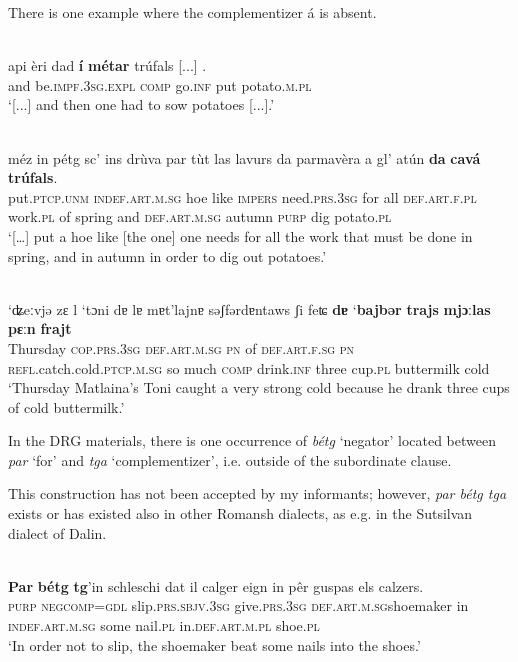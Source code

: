 There is one example where the complementizer á is absent.

\ea
\label{}
\\
	\gll [...] api èri dad \textbf{í} \textbf{métar} trúfals [...] .\\
{} and be.\textsc{impf.3sg.expl} \textsc{comp} go.\textsc{inf} put potato.\textsc{m.pl}\\
\glt `[...] and then one had to sow potatoes [...].'
\z


 \ea\label{}
 {\citealt[143]{Büchli1966}}\\
\gll  [...] méz in pétg sc’ ins drùva par tùt las lavurs da parmavèra a gl’ atún \textbf{da} \textbf{cavá} \textbf{trúfals}.\\
{} put.\textsc{ptcp.unm} \textsc{indef.art.m.sg} hoe like \textsc{impers} need.\textsc{prs.3sg} for all \textsc{def.art.f.pl} work.\textsc{pl} of spring and \textsc{def.art.m.sg} autumn \textsc{purp} dig potato.\textsc{pl}\\
\glt `[…] put a hoe like [the one] one needs for all the work that must be done in spring, and in autumn in order to dig out potatoes.'
\z

\ea\label{}
\\
\gll ‘ʥeːvjǝ zɛ l ‘tɔni dɐ lɐ mɐt’lajnɐ sǝʃfǝrdɐntaws ʃi feʨ \textbf{dɐ} ‘\textbf{bajbǝr} \textbf{trajs} \textbf{mjɔːlas} \textbf{pɛːn} \textbf{frajt}\\
     Thursday \textsc{cop.prs.3sg} \textsc{def.art.m.sg} \textsc{pn} of \textsc{def.art.f.sg} \textsc{pn} \textsc{refl}.catch.cold.\textsc{ptcp.m.sg} so much \textsc{comp} drink.\textsc{inf} three cup.\textsc{pl} buttermilk cold\\
\glt `Thursday Matlaina’s Toni caught a very strong cold because he drank three cups of cold buttermilk.'
\z

In the DRG materials, there is one occurrence of \textit{bétg} `negator' located between \textit{par} `for' and \textit{tga} `complementizer', i.e. outside of the subordinate clause.

This construction has not been accepted by my informants; however, \textit{par bétg tga} exists or has existed also in other Romansh dialects, as e.g. in the Sutsilvan dialect of Dalin.

\ea\label{}
\\
\gll  \textbf{Par} \textbf{bétg} \textbf{tg}'in schleschi dat il calger eign in pêr guspas els calzers.\\
     \textsc{purp} \textsc{neg}\textsc{comp=gdl} slip.\textsc{prs.sbjv.3sg} give.\textsc{prs.3sg} \textsc{def.art.m.sg}shoemaker in \textsc{indef.art.m.sg} some nail.\textsc{pl} in.\textsc{def.art.m.pl} shoe.\textsc{pl}\\
\glt `In order not to slip, the shoemaker beat some nails into the shoes.'
\z

